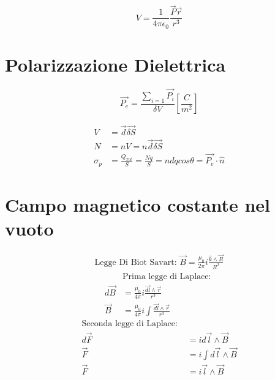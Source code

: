 \documentclass[a4paper,11pt]{article}
\begin{document}
\begin{multicols}{3}
		\begin{equation}
			V = \frac{1}{4 \pi \epsilon_0} \frac{\vec{P}\vec{r}}{r^3}
		\end{equation}
	
		\section{Polarizzazione Dielettrica}
		\begin{equation}
			\vec{P_e} = \frac{\sum_{i=1}\vec{P_i}}{\delta V} \left[\frac{C}{m^2}\right]
		\end{equation}
	
		\begin{align*}
			V &= \vec{d} \vec{\delta S} \\
			N &= nV = n\vec{d} \vec{\delta S} \\
			\sigma_p &= \frac{Q_{Tot}}{S} = \frac{Nq}{S} = ndqcos\theta = \vec{P_e} \cdot \hat{n}
		\end{align*}
	
		\section{Campo magnetico costante nel vuoto}
		\begin{align*}
			\text{Legge Di Biot Savart: }
			\vec{B} = \frac{\mu_0}{2\pi} i \frac{\hat{k} \land \vec{R}}{R^2}
		\end{align*}
		\begin{align*}
			&\text{Prima legge di Laplace: } \\
			d\vec{B} &= \frac{\mu_0}{4\pi} i \frac{\vec{dl} \land \vec{r}}{r^3} \\
			\vec{B} &= \frac{\mu_0}{4\pi} i \int\frac{\vec{dl} \land \vec{r}}{r^3}
		\end{align*}
		\begin{align*}
			\text{Seconda legge di Laplace: } \\
			d\vec{F} &= id\vec{l} \land \vec{B} \\
			\vec{F} &= i\int d\vec{l} \land \vec{B} \\
			\vec{F} &= i\vec{l} \land \vec{B}
		\end{align*}
	
	
	
	
	
	
	
	
	
	
	
	
	
	
	
	
	

\end{multicols}
\end{document}
